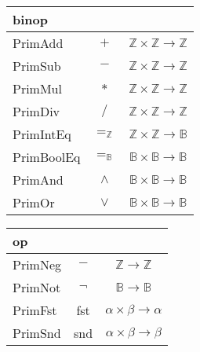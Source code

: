 \documentclass[a4paper]{scrreprt}
\begin{document}
\begin{table}[ht]
  \centering
  \begin{tabular}[t]{lcc}
    binop \\
    \midrule
    PrimAdd    & $+$            & $\mathbb{Z} \times \mathbb{Z} \to \mathbb{Z}$ \\
    PrimSub    & $-$            & $\mathbb{Z} \times \mathbb{Z} \to \mathbb{Z}$ \\
    PrimMul    & $*$            & $\mathbb{Z} \times \mathbb{Z} \to \mathbb{Z}$ \\
    PrimDiv    & $/$            & $\mathbb{Z} \times \mathbb{Z} \to \mathbb{Z}$ \\
    PrimIntEq  & $=_\mathbb{Z}$ & $\mathbb{Z} \times \mathbb{Z} \to \mathbb{B}$ \\
    PrimBoolEq & $=_\mathbb{B}$ & $\mathbb{B} \times \mathbb{B} \to \mathbb{B}$ \\
    PrimAnd    & $\land$        & $\mathbb{B} \times \mathbb{B} \to \mathbb{B}$ \\
    PrimOr     & $\lor$         & $\mathbb{B} \times \mathbb{B} \to \mathbb{B}$ \\
  \end{tabular}
  \quad
  \centering
  \begin{tabular}[t]{lcc}
    op \\
    \midrule
    PrimNeg & $-$    & $\mathbb{Z} \to \mathbb{Z}$      \\
    PrimNot & $\neg$ & $\mathbb{B} \to \mathbb{B}$      \\
    PrimFst & fst    & $\alpha \times \beta \to \alpha$ \\
    PrimSnd & snd    & $\alpha \times \beta \to \beta$  \\
  \end{tabular}
\end{table}
\end{document}
